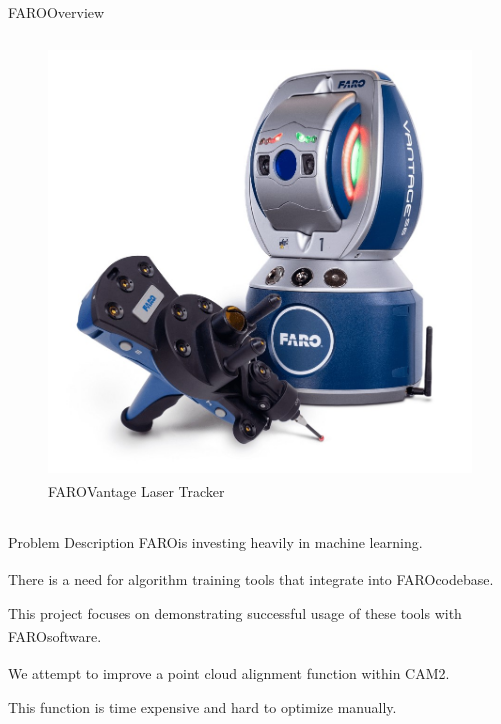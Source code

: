 \documentclass[10pt]{beamer}
\newcommand{\faro}[0]{FARO\textsuperscript{\textregistered}\space}
\begin{document}
\begin{frame}{\faro Overview}
\begin{columns}
\begin{column}{0.30\textwidth}
\begin{figure}
          \includegraphics[width=\textwidth]{images/faro-probe.jpg}
          \caption*{\faro Vantage \newline Laser Tracker}
        \end{figure}
      \end{column}
    \end{columns}
  \end{frame}
  \begin{frame}{Problem Description}
    \faro is investing heavily in machine learning. 

    There is a need for algorithm training tools that integrate into \faro codebase.

    This project focuses on demonstrating successful usage of these tools with \faro software.

    We attempt to improve a point cloud alignment function within CAM2\textsuperscript{\textregistered}.

    This function is time expensive and hard to optimize manually.
  \end{frame}
\end{document}

